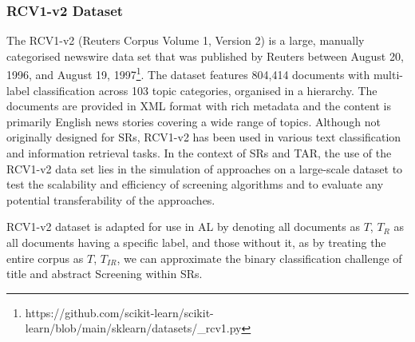 \documentclass[../main.tex]{subfiles}
\begin{document}
\subsubsection{RCV1-v2 Dataset}
The RCV1-v2 (Reuters Corpus Volume 1, Version 2) is a large, manually categorised newswire data set \cite{lewis_rcv1_2004} that was published by Reuters between August 20, 1996, and August 19, 1997\footnote{https://github.com/scikit-learn/scikit-learn/blob/main/sklearn/datasets/\_rcv1.py}. The dataset features 804,414 documents with multi-label classification across 103 topic categories, organised in a hierarchy. The documents are provided in XML format with rich metadata and the content is primarily English news stories covering a wide range of topics.
Although not originally designed for SRs, RCV1-v2 has been used in various text classification and information retrieval tasks.  In the context of SRs and TAR, the use of the RCV1-v2 data set lies in the simulation of approaches on a large-scale dataset to test the scalability and efficiency of screening algorithms and to evaluate any potential transferability of the approaches.

RCV1-v2 dataset is adapted for use in AL by denoting all documents as \textbf{$T$}, \textbf{$T_R$} as all documents having a specific label, and those without it, as by treating the entire corpus as \textbf{$T$}, \textbf{$T_{IR}$}, we can approximate the binary classification challenge of title and abstract Screening within SRs.
\end{document}
